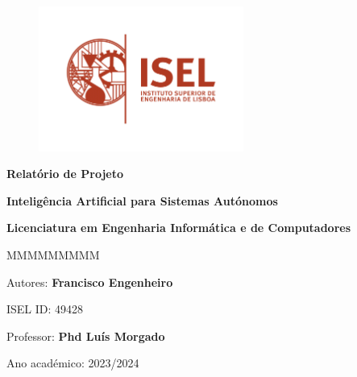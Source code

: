 \begin{figure}
    \centering
    \includegraphics[width=0.6\textwidth]{../figures/logo-isel}
    \label{fig:isel-logo}
\end{figure}

\begin{center}

    \vspace*{2cm} %

    \textbf{\Huge{}Relatório de Projeto}

    \vspace{1cm}

    \textbf{\LARGE{}Inteligência Artificial para Sistemas Autónomos}

    \textbf{\large{}Licenciatura em Engenharia Informática e de Computadores}{\huge\par}


    \vfill{} %

    \begin{lyxlist}{MMMMMMMMM}
        \begin{singlespace}
            \item [{Autores:}] \textbf{Francisco Engenheiro}
            \item [{ISEL ID:}]  49428
            \item [{Professor:}] \textbf{Phd Luís Morgado}
            \item [{Ano académico:}] 2023/2024
        \end{singlespace}
    \end{lyxlist}
\end{center}
